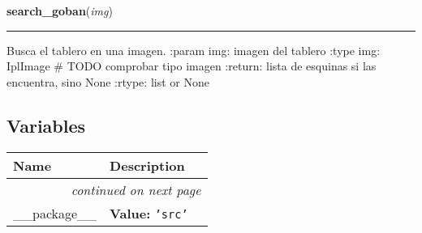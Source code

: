    \label{src:search_goban:search_goban}

    \vspace{0.5ex}

\hspace{.8\funcindent}\begin{boxedminipage}{\funcwidth}

    \raggedright \textbf{search\_goban}(\textit{img})

    \vspace{-1.5ex}

    \rule{\textwidth}{0.5\fboxrule}
\setlength{\parskip}{2ex}

Busca el tablero en una imagen.
:param img: imagen del tablero
:type img: IplImage \# TODO comprobar tipo imagen
:return: lista de esquinas si las encuentra, sino None
:rtype: list or None
\setlength{\parskip}{1ex}
    \end{boxedminipage}



  \subsection{Variables}

    \vspace{-1cm}
\hspace{\varindent}\begin{longtable}{|p{\varnamewidth}|p{\vardescrwidth}|l}
\cline{1-2}
\cline{1-2} \centering \textbf{Name} & \centering \textbf{Description}& \\
\cline{1-2}
\endhead\cline{1-2}\multicolumn{3}{r}{\small\textit{continued on next page}}\\\endfoot\cline{1-2}
\endlastfoot\raggedright \_\-\_\-p\-a\-c\-k\-a\-g\-e\-\_\-\_\- & \raggedright \textbf{Value:} 
{\tt \texttt{'}\texttt{src}\texttt{'}}&\\
\cline{1-2}
\end{longtable}

